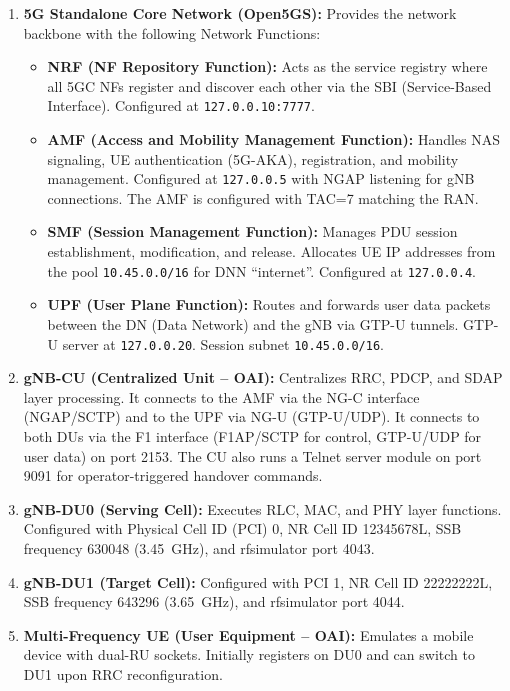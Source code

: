 \begin{enumerate}[leftmargin=*]
    \item \textbf{5G Standalone Core Network (Open5GS):} Provides the network backbone with the following Network Functions:
    \begin{itemize}
        \item \textbf{NRF (NF Repository Function):} Acts as the service registry where all 5GC NFs register and discover each other via the SBI (Service-Based Interface). Configured at \texttt{127.0.0.10:7777}.
        \item \textbf{AMF (Access and Mobility Management Function):} Handles NAS signaling, UE authentication (5G-AKA), registration, and mobility management. Configured at \texttt{127.0.0.5} with NGAP listening for gNB connections. The AMF is configured with TAC=7 matching the RAN.
        \item \textbf{SMF (Session Management Function):} Manages PDU session establishment, modification, and release. Allocates UE IP addresses from the pool \texttt{10.45.0.0/16} for DNN ``internet''. Configured at \texttt{127.0.0.4}.
        \item \textbf{UPF (User Plane Function):} Routes and forwards user data packets between the DN (Data Network) and the gNB via GTP-U tunnels. GTP-U server at \texttt{127.0.0.20}. Session subnet \texttt{10.45.0.0/16}.
    \end{itemize}
    
    \item \textbf{gNB-CU (Centralized Unit -- OAI):} Centralizes RRC, PDCP, and SDAP layer processing. It connects to the AMF via the NG-C interface (NGAP/SCTP) and to the UPF via NG-U (GTP-U/UDP). It connects to both DUs via the F1 interface (F1AP/SCTP for control, GTP-U/UDP for user data) on port 2153. The CU also runs a Telnet server module on port 9091 for operator-triggered handover commands.
    
    \item \textbf{gNB-DU0 (Serving Cell):} Executes RLC, MAC, and PHY layer functions. Configured with Physical Cell ID (PCI) 0, NR Cell ID 12345678L, SSB frequency 630048 (3.45~GHz), and rfsimulator port 4043.
    
    \item \textbf{gNB-DU1 (Target Cell):} Configured with PCI 1, NR Cell ID 22222222L, SSB frequency 643296 (3.65~GHz), and rfsimulator port 4044.
    
    \item \textbf{Multi-Frequency UE (User Equipment -- OAI):} Emulates a mobile device with dual-RU sockets. Initially registers on DU0 and can switch to DU1 upon RRC reconfiguration.
\end{enumerate}

